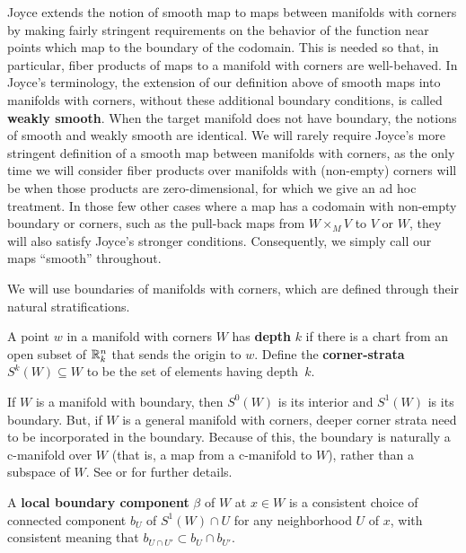 Joyce extends the notion of smooth map to maps between manifolds with corners by making fairly stringent requirements on the behavior of the function near points which map to the boundary of the codomain.
This is needed so that, in particular, fiber products of maps to a manifold with corners are well-behaved.
In Joyce's terminology, the extension of our definition above of smooth maps into manifolds with corners, without these additional boundary conditions, is called {\bf weakly smooth}.
When the target manifold does not have boundary, the notions of smooth and weakly smooth are identical.
We will rarely require Joyce's more stringent definition of a smooth map between manifolds with corners, as the only time we will consider fiber products over manifolds with (non-empty) corners will be when those products are zero-dimensional, for which we give an ad hoc treatment.
In those few other cases where a map has a codomain with non-empty boundary or corners, such as the pull-back maps from $W \times_M V$ to $V$ or $W$, they will also satisfy Joyce's stronger conditions.
Consequently, we simply call our maps ``smooth'' throughout.

We will use boundaries of manifolds with corners, which are defined through their natural stratifications.

\begin{definition}
	A point $w$ in a manifold with corners $W$ has \textbf{depth} $k$ if there is a chart from an open subset of $\mathbb{R}^n_k$ that sends the origin to $w$.
	Define the {\bf corner-strata} $S^k(W) \subseteq W$ to be the set of elements having depth~$k$.
\end{definition}

If $W$ is a manifold with boundary, then $S^0(W)$ is its interior and $S^1(W)$ is its boundary.
But, if $W$ is a general manifold with corners, deeper corner strata need to be incorporated in the boundary.
Because of this, the boundary is naturally a c-manifold over $W$ (that is, a map from a c-manifold to $W$), rather than a subspace of $W$.
See \cite[Section 2]{Joy12} or \cite[Section 2.1]{medina2022foundations} for further details.

\begin{definition}
	A \textbf{local boundary component} $\beta$ of $W$ at $x \in W$ is a consistent choice of connected component $b_U$ of $S^1(W) \cap U$ for any neighborhood $U$ of $x$, with consistent meaning that $b_{U \cap U'} \subset b_{U} \cap b_{U'}$.
\end{definition}

